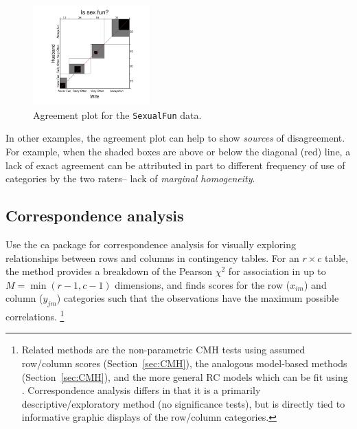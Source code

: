 \documentclass[10pt,twoside]{article}\usepackage[]{graphicx}\usepackage[]{color}
\newcommand{\secref}[1]{Section~\ref{#1}}
\newcommand{\data}[1]{\texttt{#1}}
\newcommand{\codefun}[1]{\code{#1()}}
\newcommand{\pkg}[1]{{\normalfont\fontseries{b}\selectfont #1}}
\begin{document}
\begin{figure}[htb]
\begin{center}
\includegraphics[width=0.4\textwidth,trim=50 25 50 25]{fig/vcd-tut-agreesex}
\caption{Agreement plot for the \data{SexualFun} data.}
\label{fig:agreesex}
\end{center}
\end{figure}
In other examples, the agreement plot can help to show \emph{sources}
of disagreement.  For example, when the shaded boxes are above or below the diagonal
(red) line, a lack of exact agreement can be attributed in part to
different frequency of use of categories by the two raters-- lack of
\emph{marginal homogeneity}.
	
\subsection{Correspondence analysis}
Use the \pkg{ca} package for correspondence analysis for visually exploring relationships
between rows and columns in contingency tables.  For an $r \times c$ table,
the method provides a breakdown of the Pearson $\chi^2$ for association in up to $M = \min(r-1, c-1)$
dimensions, and finds scores for the row ($x_{im}$) and column ($y_{jm}$) categories
such that the observations have the maximum possible correlations.%
\footnote{
	Related methods are the non-parametric
	CMH tests using assumed row/column scores (\secref{sec:CMH}),
	the analogous \codefun{glm} model-based methods (\secref{sec:CMH}),
	and the more general RC models which can be fit using \codefun{gnm}.
	Correspondence analysis differs in that it is a primarily
	descriptive/exploratory method (no significance tests), but is
	directly tied to informative graphic displays of the row/column categories.
}	
	
\end{document}
